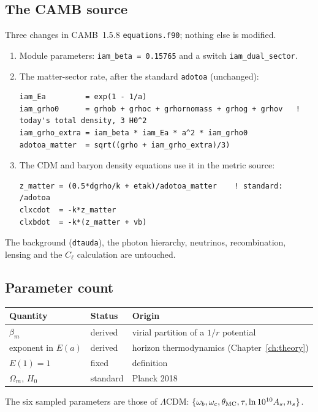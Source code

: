 \subsection{The CAMB source}
Three changes in CAMB~1.5.8 \texttt{equations.f90}; nothing else is modified.
\begin{enumerate}
\item Module parameters: \verb|iam_beta = 0.15765| and a switch \verb|iam_dual_sector|.
\item The matter-sector rate, after the standard \verb|adotoa| (unchanged):
\begin{verbatim}
iam_Ea         = exp(1 - 1/a)
iam_grho0      = grhob + grhoc + grhornomass + grhog + grhov   ! today's total density, 3 H0^2
iam_grho_extra = iam_beta * iam_Ea * a^2 * iam_grho0
adotoa_matter  = sqrt((grho + iam_grho_extra)/3)
\end{verbatim}
\item The CDM and baryon density equations use it in the metric source:
\begin{verbatim}
z_matter = (0.5*dgrho/k + etak)/adotoa_matter    ! standard: /adotoa
clxcdot  = -k*z_matter
clxbdot  = -k*(z_matter + vb)
\end{verbatim}
\end{enumerate}
The background (\verb|dtauda|), the photon hierarchy, neutrinos, recombination, lensing and the $C_\ell$ calculation are untouched.

\subsection{Parameter count}
\begin{center}\small
\begin{tabular}{lll}\hline
Quantity & Status & Origin\\\hline
$\beta_m$ & derived & virial partition of a $1/r$ potential\\
exponent in $E(a)$ & derived & horizon thermodynamics (Chapter~\ref{ch:theory})\\
$E(1)=1$ & fixed & definition\\
$\Omega_m$, $H_0$ & standard & Planck 2018\\\hline
\end{tabular}
\end{center}
The six sampled parameters are those of $\Lambda$CDM: $\{\omega_b,\omega_c,\theta_{\rm MC},\tau,\ln10^{10}A_s,n_s\}$.

